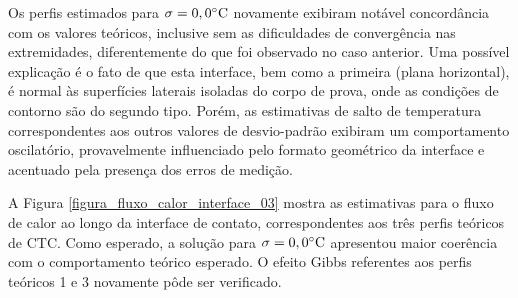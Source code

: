 Os perfis estimados para $\sigma = 0,0\celsius$ novamente exibiram notável concordância com os valores teóricos, inclusive sem as dificuldades de convergência nas extremidades, diferentemente do que foi observado no caso anterior. Uma possível explicação é o fato de que esta interface, bem como a primeira (plana horizontal), é normal às superfícies laterais isoladas do corpo de prova, onde as condições de contorno são do segundo tipo. Porém, as estimativas de salto de temperatura correspondentes aos outros valores de desvio-padrão exibiram um comportamento oscilatório, provavelmente influenciado pelo formato geométrico da interface e acentuado pela presença dos erros de medição.
%
%

A Figura \ref{figura_fluxo_calor_interface_03} mostra as estimativas para o fluxo de calor ao longo da interface de contato, correspondentes aos três perfis teóricos de CTC. Como esperado, a solução para $\sigma = 0,0\celsius$ apresentou maior coerência com o comportamento teórico esperado. O efeito Gibbs referentes aos perfis teóricos 1 e 3 novamente pôde ser verificado.

